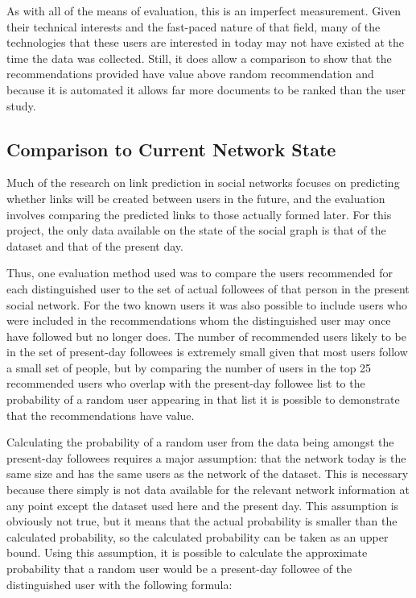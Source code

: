 As with all of the means of evaluation, this is an imperfect measurement. Given their technical interests and the fast-paced nature of that field, many of the technologies that these users are interested in today may not have existed at the time the data was collected. Still, it does allow a comparison to show that the recommendations provided have value above random recommendation and because it is automated it allows far more documents to be ranked than the user study.



\subsection{Comparison to Current Network State}
\label{sec:ComparisonToCurrentNetwork}

Much of the research on link prediction in social networks focuses on predicting whether links will be created between users in the future, and the evaluation involves comparing the predicted links to those actually formed later. For this project, the only data available on the state of the social graph is that of the dataset and that of the present day.

Thus, one evaluation method used was to compare the users recommended for each distinguished user to the set of actual followees of that person in the present social network. For the two known users it was also possible to include users who were included in the recommendations whom the distinguished user may once have followed but no longer does. The number of recommended users likely to be in the set of present-day followees is extremely small given that most users follow a small set of people, but by comparing the number of users in the top 25 recommended users who overlap with the present-day followee list to the probability of a random user appearing in that list it is possible to demonstrate that the recommendations have value.

Calculating the probability of a random user from the data being amongst the present-day followees requires a major assumption: that the network today is the same size and has the same users as the network of the dataset. This is necessary because there simply is not data available for the relevant network information at any point except the dataset used here and the present day. This assumption is obviously not true, but it means that the actual probability is smaller than the calculated probability, so the calculated probability can be taken as an upper bound. Using this assumption, it is possible to calculate the approximate probability that a random user would be a present-day followee of the distinguished user with the following formula:



